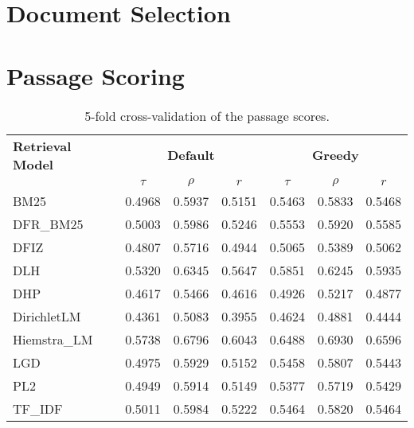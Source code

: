 \section{Document Selection}\label{eval-doucment-selection}

\section{Passage Scoring}\label{eval-passage-scoring}

\begin{table}[h!]
    \centering
    \caption{5-fold cross-validation of the passage scores.}
    \begin{tabular}{lcccccc}
        \toprule
        \textbf{Retrieval Model} & \multicolumn{3}{c}{\textbf{Default}} & \multicolumn{3}{c}{\textbf{Greedy}} \\
        \cmidrule(lr){2-4} \cmidrule(lr){5-7}
                                 & $\tau$ & $\rho$ & $r$ & $\tau$ & $\rho$ & $r$ \\
        \midrule

        BM25         & 0.4968 & 0.5937 & 0.5151 & 0.5463 & 0.5833 & 0.5468 \\
        DFR\_BM25    & 0.5003 & 0.5986 & 0.5246 & 0.5553 & 0.5920 & 0.5585 \\
        DFIZ         & 0.4807 & 0.5716 & 0.4944 & 0.5065 & 0.5389 & 0.5062 \\
        DLH          & 0.5320 & 0.6345 & 0.5647 & 0.5851 & 0.6245 & 0.5935 \\
        DHP          & 0.4617 & 0.5466 & 0.4616 & 0.4926 & 0.5217 & 0.4877 \\
        DirichletLM  & 0.4361 & 0.5083 & 0.3955 & 0.4624 & 0.4881 & 0.4444 \\
        Hiemstra\_LM & 0.5738 & 0.6796 & 0.6043 & 0.6488 & 0.6930 & 0.6596 \\
        LGD          & 0.4975 & 0.5929 & 0.5152 & 0.5458 & 0.5807 & 0.5443 \\
        PL2          & 0.4949 & 0.5914 & 0.5149 & 0.5377 & 0.5719 & 0.5429 \\
        TF\_IDF      & 0.5011 & 0.5984 & 0.5222 & 0.5464 & 0.5820 & 0.5464 \\
        \bottomrule
    \end{tabular}
\end{table}

